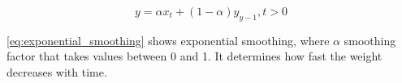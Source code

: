 \begin{equation}
    \label{eq:exponential_smoothing}
    y = \alpha x_t + (1 - \alpha)y_{y-1}, t > 0
\end{equation}

\autoref{eq:exponential_smoothing}
shows exponential smoothing, where $\alpha$ smoothing factor
that takes values between 0 and 1. It determines how fast the weight decreases with time.




